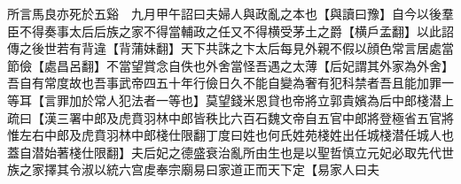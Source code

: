 所言馬良亦死於五谿　九月甲午詔曰夫婦人與政亂之本也【與讀曰豫】自今以後羣臣不得奏事太后后族之家不得當輔政之任又不得横受茅土之爵【横戶孟翻】以此詔傳之後世若有背違【背蒲妹翻】天下共誅之卞太后每見外親不假以顔色常言居處當節儉【處昌呂翻】不當望賞念自佚也外舍當怪吾遇之太薄【后妃謂其外家為外舍】吾自有常度故也吾事武帝四五十年行儉日久不能自變為奢有犯科禁者吾且能加罪一等耳【言罪加於常人犯法者一等也】莫望錢米恩貸也帝將立郭貴嬪為后中郎棧潜上疏曰【漢三署中郎及虎賁羽林中郎皆秩比六百石魏文帝自五官中郎將登極省五官將惟左右中郎及虎賁羽林中郎棧仕限翻丁度曰姓也何氏姓苑棧姓出任城棧潜任城人也蓋自潜始著棧仕限翻】夫后妃之德盛衰治亂所由生也是以聖哲慎立元妃必取先代世族之家擇其令淑以統六宫䖍奉宗廟易曰家道正而天下定【易家人曰夫